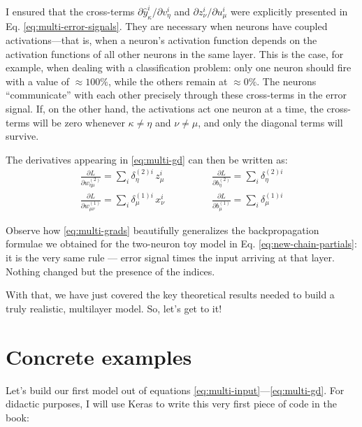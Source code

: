 \documentclass[11pt,a4paper,oneside]{book}
\theoremstyle{definition}
\theoremstyle{plain}
\theoremstyle{remark}
\begin{document}
I ensured that the cross-terms $\partial \hat y^i_\kappa/\partial v^i_\eta$ and $\partial z^i_\nu/\partial u^i_\mu$ were explicitly presented in Eq. \eqref{eq:multi-error-signals}. They are necessary when neurons have coupled activations—that is, when a neuron's activation function depends on the activation functions of all other neurons in the same layer. This is the case, for example, when dealing with a classification problem: only one neuron should fire with a value of $\approx 100\%$, while the others remain at $\approx 0\%$. The neurons ``communicate'' with each other precisely through these cross-terms in the error signal. If, on the other hand, the activations act one neuron at a time, the cross-terms will be zero whenever $\kappa\neq\eta$ and $\nu\neq\mu$, and only the diagonal terms will survive.

The derivatives appearing in \eqref{eq:multi-gd} can then be written as:
\begin{equation}
    \label{eq:multi-grads}
    \begin{split}
        \frac{\partial L}{\partial w^{(2)}_{\eta\mu}} = \sum_i \delta^{(2)i}_\eta\,z^i_\mu
        &\qquad\qquad
        \frac{\partial L}{\partial b^{(2)}_{\eta}} = \sum_i \delta^{(2)i}_\eta\\[2pt]
        \frac{\partial L}{\partial w^{(1)}_{\mu\nu}} = \sum_i \delta^{(1)i}_\mu\,x^i_\nu
        &\qquad\qquad
        \frac{\partial L}{\partial b^{(1)}_{\mu}} = \sum_i \delta^{(1)i}_\mu
    \end{split}
\end{equation}

Observe how \eqref{eq:multi-grads} beautifully generalizes the backpropagation formulae we obtained for the two-neuron toy model in Eq. \eqref{eq:new-chain-partials}: it is the very same rule --- error signal times the input arriving at that layer. Nothing changed but the presence of the indices.



With that, we have just covered the key theoretical results needed to build a truly realistic, multilayer model. So, let's get to it!


\chapter{Concrete examples}

Let's build our first model out of equations \eqref{eq:multi-input}---\eqref{eq:multi-gd}. For didactic purposes, I will use Keras to write this very first piece of code in the book:
\end{document}
